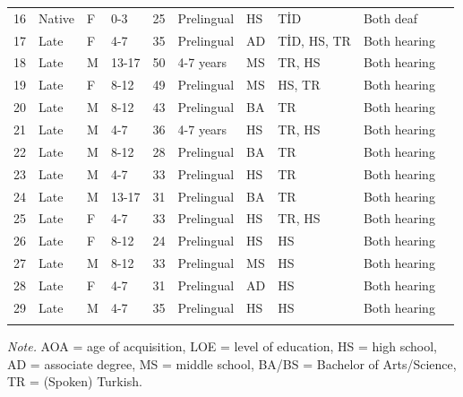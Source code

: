 \documentclass[
  english,
  doc,mask]{apa6}
\begin{document}
\begin{table}[tbp]
\begin{center}
\begin{threeparttable}
{\begin{tabular*}{\textwidth}{c @{\extracolsep{\fill}}lllllllll}
16 & Native & F & 0-3 & 25 & Prelingual & HS & TİD & Both deaf\\
17 & Late & F & 4-7 & 35 & Prelingual & AD & TİD, HS, TR & Both hearing\\
18 & Late & M & 13-17 & 50 & 4-7 years & MS & TR, HS & Both hearing\\
19 & Late & F & 8-12 & 49 & Prelingual & MS & HS, TR & Both hearing\\
20 & Late & M & 8-12 & 43 & Prelingual & BA & TR & Both hearing\\
21 & Late & M & 4-7 & 36 & 4-7 years & HS & TR, HS & Both hearing\\
22 & Late & M & 8-12 & 28 & Prelingual & BA & TR & Both hearing\\
23 & Late & M & 4-7 & 33 & Prelingual & HS & TR & Both hearing\\
24 & Late & M & 13-17 & 31 & Prelingual & BA & TR & Both hearing\\
25 & Late & F & 4-7 & 33 & Prelingual & HS & TR, HS & Both hearing\\
26 & Late & F & 8-12 & 24 & Prelingual & HS & HS & Both hearing\\
27 & Late & M & 8-12 & 33 & Prelingual & MS & HS & Both hearing\\
28 & Late & F & 4-7 & 31 & Prelingual & AD & HS & Both hearing\\
29 & Late & M & 4-7 & 35 & Prelingual & HS & HS & Both hearing\\
\bottomrule
\addlinespace
\end{tabular*}

}

\begin{tablenotes}[para]
\normalsize{\textit{Note.} AOA = age of acquisition, LOE = level of education, HS = high school, AD = associate degree, MS = middle school, BA/BS = Bachelor of Arts/Science, TR = (Spoken) Turkish.}
\end{tablenotes}

\end{threeparttable}
\end{center}

\end{table}

\endgroup
\end{document}
